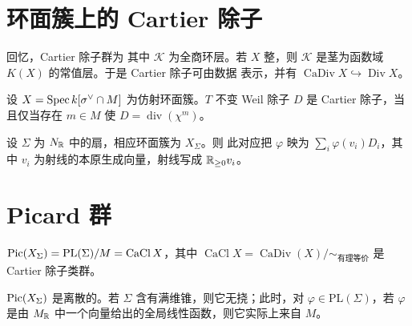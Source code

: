 \section{环面簇上的 Cartier 除子}
回忆，Cartier 除子群为
其中 $\mathcal K$ 为全商环层。若 $X$ 整，则 $\mathcal K$ 是茎为函数域 $K(X)$ 的常值层。于是 Cartier 除子可由数据
表示，并有 $\operatorname{CaDiv}X\hookrightarrow\operatorname{Div}X$。
\begin{lemma}\label{lem:4.16}
设 $X=\operatorname{Spec} k[\sigma^\vee\cap M]$ 为仿射环面簇。$T$ 不变 Weil 除子 $D$ 是 Cartier 除子，当且仅当存在 $m\in M$ 使 $D=\operatorname{div}(\chi^m)$。
\end{lemma}
\begin{proposition}\label{prop:4.17}
设 $\Sigma$ 为 $N_{\mathbb R}$ 中的扇，相应环面簇为 $X_\Sigma$。则
此对应把 $\varphi$ 映为 $\sum_i\varphi(v_i)D_i$，其中 $v_i$ 为射线的本原生成向量，射线写成 $\mathbb R_{\ge0}v_i$。
\end{proposition}
\section{Picard 群}
\begin{proposition}\label{prop:4.18}
$\operatorname{Pic}(X_\Sigma)=\mathrm{PL}(\Sigma)/M=\operatorname{CaCl}X$，其中 $\operatorname{CaCl}X=\operatorname{CaDiv}(X)/{\sim_{\text{有理等价}}}$ 是 Cartier 除子类群。
\end{proposition}
\begin{corollary}\label{cor:4.19}
$\operatorname{Pic}(X_\Sigma)$ 是离散的。若 $\Sigma$ 含有满维锥，则它无挠；此时，对 $\varphi\in\mathrm{PL}(\Sigma)$，若 $\varphi$ 是由 $M_{\mathbb R}$ 中一个向量给出的全局线性函数，则它实际上来自 $M$。
\end{corollary}
